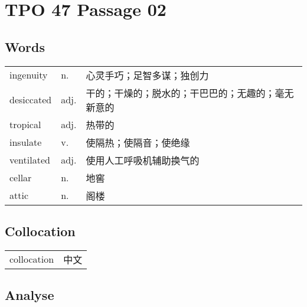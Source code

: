 \section{TPO 47 Passage 02}

\subsection{Words}

\begin{tabular}{lll}
    ingenuity  & n.   & 心灵手巧；足智多谋；独创力             \\
    desiccated & adj. & 干的；干燥的；脱水的；干巴巴的；无趣的；毫无新意的 \\
    tropical   & adj. & 热带的                       \\
    insulate   & v.   & 使隔热；使隔音；使绝缘               \\
    ventilated & adj. & 使用人工呼吸机辅助换气的              \\
    cellar     & n.   & 地窖                        \\
    attic      & n.   & 阁楼                        \\
\end{tabular}

\subsection{Collocation}

\begin{tabular}{ll}
    collocation & 中文 \\
\end{tabular}

\subsection{Analyse}

